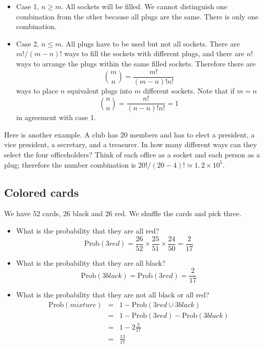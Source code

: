\documentclass[justified, sixbynine]{tufte-book}
\theoremstyle{plain}%
\newtheorem * {corollary}{Corollary}
\theoremstyle{definition}
\theoremstyle{remark}
\newtheorem * {remark}{Remark}
\newtheorem * {note}{Note}
\begin{document}
\begin{fullwidth}
\begin{itemize}
\item  Case 1, $n\geq m$. All sockets will be filled. We cannot distinguish
one combination from the other because all plugs are the same. There is only
one combination.

\item  Case 2, $n\leq m$. All plugs have to be used but not all sockets.
There are $m!/(m-n)!$ ways to fill the sockets with different plugs, and
there are $n!$ ways to arrange the plugs within the same filled sockets.
Therefore there are
\begin{equation}
\binom mn=\frac{m!}{(m-n)!n!}
\end{equation}
ways to place $n$ equivalent plugs into $m$ different sockets. Note that if $%
m=n$%
\begin{equation}
\binom nn=\frac{n!}{(n-n)!n!}=1
\end{equation}
in agreement with case 1.
\end{itemize}

Here is another example. A club has 20 members and has to elect a president, a vice president,
a secretary, and a treasurer. In how many different ways can they select the
four officeholders? Think of each office as a socket and each person as a
plug; therefore the number combination is $20!/(20-4)!\simeq \allowbreak
1.\, 2\times 10^5$.

\goodbreak\subsection{Colored cards}

We have 52 cards, 26 black and 26 red. We shuffle the cards and pick three.

\begin{itemize}
\item  What is the probability that they are all red?
\begin{equation}
\textrm{Prob}(3red)=\frac{26}{52}\times \frac{25}{51}\times \frac{24}{50}=\frac{2}{17}
\end{equation}

\item  What is the probability that they are all black?
\begin{equation}
\textrm{Prob}(3black)=\textrm{Prob}(3red)=\frac{2}{17}
\end{equation}

\item  What is the probability that they are not all black or all red?
\begin{eqnarray}
\textrm{Prob}(mixture) &=&1-\textrm{Prob}(3red\cup 3black) \\
&=&1-\textrm{Prob}(3red)-\textrm{Prob}(3black) \\
&=&1-2\frac{2}{17} \\
&=&\frac{13}{17}
\end{eqnarray}
\end{itemize}


\end{fullwidth}
\end{document}
